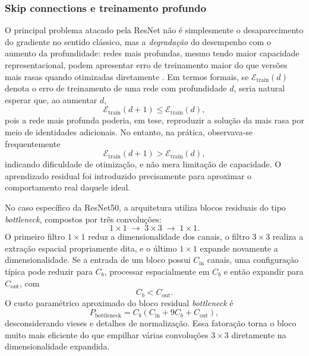 \documentclass[tcc,capa]{texufpel}
\begin{document}
\subsubsection{Skip connections e treinamento profundo}

O principal problema atacado pela ResNet não é simplesmente o desaparecimento do gradiente no sentido clássico, mas a \textit{degradação} do desempenho com o aumento da profundidade: redes mais profundas, mesmo tendo maior capacidade representacional, podem apresentar erro de treinamento maior do que versões mais rasas quando otimizadas diretamente \cite{He2016}. Em termos formais, se \(\mathcal{E}_{\text{train}}(d)\) denota o erro de treinamento de uma rede com profundidade \(d\), seria natural esperar que, ao aumentar \(d\),
\begin{equation}
	\mathcal{E}_{\text{train}}(d+1) \leq \mathcal{E}_{\text{train}}(d),
\end{equation}
pois a rede mais profunda poderia, em tese, reproduzir a solução da mais rasa por meio de identidades adicionais. No entanto, na prática, observava-se frequentemente
\begin{equation}
	\mathcal{E}_{\text{train}}(d+1) > \mathcal{E}_{\text{train}}(d),
\end{equation}
indicando dificuldade de otimização, e não mera limitação de capacidade. O aprendizado residual foi introduzido precisamente para aproximar o comportamento real daquele ideal.

No caso específico da ResNet50, a arquitetura utiliza blocos residuais do tipo \textit{bottleneck}, compostos por três convoluções:
\begin{equation}
	1\times 1 \;\rightarrow\; 3\times 3 \;\rightarrow\; 1\times 1.
\end{equation}
O primeiro filtro \(1\times1\) reduz a dimensionalidade dos canais, o filtro \(3\times3\) realiza a extração espacial propriamente dita, e o último \(1\times1\) expande novamente a dimensionalidade. Se a entrada de um bloco possui \(C_{\text{in}}\) canais, uma configuração típica pode reduzir para \(C_b\), processar espacialmente em \(C_b\) e então expandir para \(C_{\text{out}}\), com
\begin{equation}
	C_b < C_{\text{out}}.
\end{equation}
O custo paramétrico aproximado do bloco residual \textit{bottleneck} é
\begin{equation}
	P_{\text{bottleneck}}
	=
	C_b(C_{\text{in}} + 9C_b + C_{\text{out}}),
\end{equation}
desconsiderando vieses e detalhes de normalização. Essa fatoração torna o bloco muito mais eficiente do que empilhar várias convoluções \(3\times3\) diretamente na dimensionalidade expandida.
\end{document}
